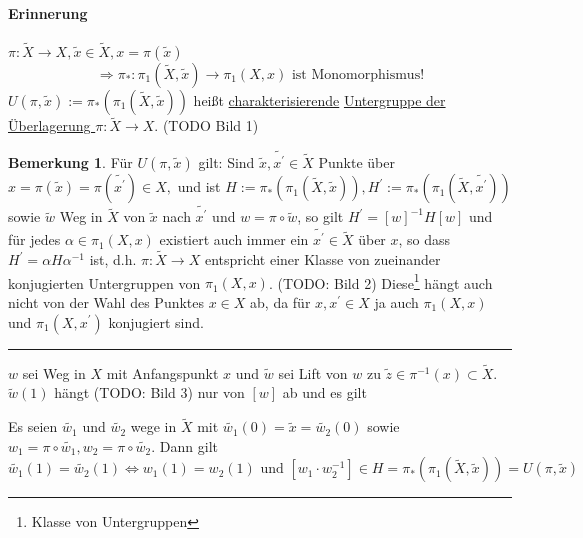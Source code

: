 \documentclass[a4paper,11pt,notitlepage]{report}
\theoremstyle{definition}
\newtheorem{remark}{Bemerkung}[chapter]
\begin{document}

\paragraph{Erinnerung} $\pi \colon \widetilde{X} \rightarrow X, \widetilde{x} \in \widetilde{X}, x = \pi(\widetilde{x})$
$$\Rightarrow \pi_* \colon \pi_1(\widetilde{X},\widetilde{x}) \rightarrow \pi_1(X,x) \text{ ist Monomorphismus!}$$
$U(\pi, \widetilde{x}) := \pi_*(\pi_1(\widetilde{X},\widetilde{x}))$ heißt \underline{charakterisierende} \underline{Untergruppe der Überlagerung $\pi \colon \widetilde{X} \rightarrow X$}.
(TODO Bild 1)

\begin{remark}
	Für $U(\pi, \widetilde{x})$ gilt:
	\newline
	Sind $\widetilde{x}, \widetilde{x^\prime} \in \widetilde{X}$ Punkte über $x = \pi(\widetilde{x}) = \pi(\widetilde{x^\prime}) \in X,$ und ist $H:=\pi_*(\pi_1(\widetilde{X},\widetilde{x})), H^\prime:= \pi_*(\pi_1(\widetilde{X},\widetilde{x^\prime}))$ sowie $\widetilde{w}$ Weg in $\widetilde{X}$ von $\widetilde{x}$ nach $\widetilde{x^\prime}$ und $w = \pi \circ \widetilde{w}$, so gilt $\boxed{H^\prime = [w]^{-1} H [w]}$ und für jedes $\alpha \in \pi_1(X,x)$ existiert auch immer ein $\widetilde{x^\prime} \in \widetilde{X}$ über $x$, so dass $H^\prime = \alpha H \alpha^{-1}$ ist, d.h. $\pi \colon \widetilde{X} \rightarrow X$ entspricht einer Klasse von zueinander konjugierten Untergruppen von $\pi_1(X,x)$. (TODO: Bild 2)
	\newline
	Diese\footnote{Klasse von Untergruppen} hängt auch nicht von der Wahl des Punktes $x \in X$ ab, da für $x, x^\prime \in X$ ja auch $\pi_1(X,x)$ und $\pi_1(X,x^\prime)$ konjugiert sind.
\end{remark}	
\hrule
	$w$ sei Weg in $X$ mit Anfangspunkt $x$ und $\widetilde{w}$ sei Lift von $w$ zu $\widetilde{z} \in \pi^{-1}(x) \subset \widetilde{X}$. $\widetilde{w}(1)$ hängt (TODO: Bild 3) nur von $[w]$ ab und es gilt

\begin{theorem}
	Es seien $\widetilde{w_1}$ und $\widetilde{w_2}$ wege in $\widetilde{X}$ mit $\widetilde{w_1}(0) = \widetilde{x} = \widetilde{w_2}(0)$ sowie $w_1 = \pi \circ \widetilde{w_1}, w_2 = \pi \circ \widetilde{w_2}$. Dann gilt
	$$\widetilde{w_1}(1) = \widetilde{w_2}(1) \Leftrightarrow w_1(1) = w_2(1) \text{ und } [w_1 \cdot w_2^{-1}] \in H = \pi_*(\pi_1(\widetilde{X}, \widetilde{x})) = U(\pi, \widetilde{x})$$
\end{theorem}
\end{document}

